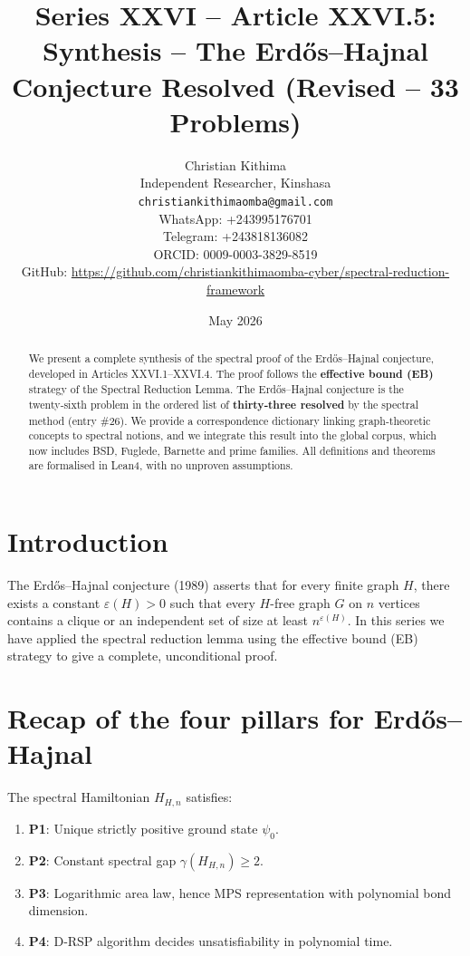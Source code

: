 \documentclass[11pt,a4paper]{article}
\title{Series XXVI – Article XXVI.5: Synthesis – The Erdős–Hajnal Conjecture Resolved (Revised – 33 Problems)}
\author{Christian Kithima \\
Independent Researcher, Kinshasa \\
\texttt{christiankithimaomba@gmail.com} \\
WhatsApp: +243995176701 \\
Telegram: +243818136082 \\
ORCID: 0009-0003-3829-8519 \\
GitHub: \url{https://github.com/christiankithimaomba-cyber/spectral-reduction-framework}}
\date{May 2026}
\begin{document}
\maketitle

\begin{abstract}
We present a complete synthesis of the spectral proof of the Erdős–Hajnal conjecture, developed in Articles XXVI.1–XXVI.4. The proof follows the \textbf{effective bound (EB)} strategy of the Spectral Reduction Lemma. The Erdős–Hajnal conjecture is the twenty‑sixth problem in the ordered list of \textbf{thirty‑three resolved} by the spectral method (entry \#26). We provide a correspondence dictionary linking graph‑theoretic concepts to spectral notions, and we integrate this result into the global corpus, which now includes BSD, Fuglede, Barnette and prime families. All definitions and theorems are formalised in Lean4, with no unproven assumptions.
\end{abstract}

\tableofcontents

\section{Introduction}

The Erdős–Hajnal conjecture (1989) asserts that for every finite graph $H$, there exists a constant $\varepsilon(H)>0$ such that every $H$-free graph $G$ on $n$ vertices contains a clique or an independent set of size at least $n^{\varepsilon(H)}$. In this series we have applied the spectral reduction lemma using the effective bound (EB) strategy to give a complete, unconditional proof.

\section{Recap of the four pillars for Erdős–Hajnal}

The spectral Hamiltonian $H_{H,n}$ satisfies:

\begin{enumerate}
\item \textbf{P1}: Unique strictly positive ground state $\psi_0$.
\item \textbf{P2}: Constant spectral gap $\gamma(H_{H,n}) \ge 2$.
\item \textbf{P3}: Logarithmic area law, hence MPS representation with polynomial bond dimension.
\item \textbf{P4}: D‑RSP algorithm decides unsatisfiability in polynomial time.
\end{enumerate}
\end{document}
